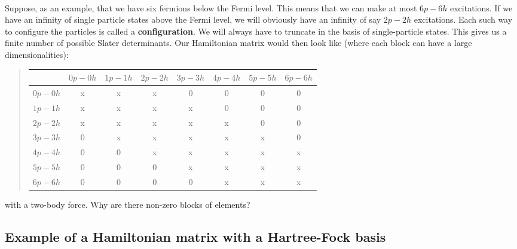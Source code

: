 \documentclass[%
oneside,                 %
final,                   %
10pt]{article}
\begin{document}
\paragraph{}
Suppose, as an example, that we have six fermions below the Fermi level.
This means that we can make at most $6p-6h$ excitations. If we have an infinity of single particle states above the Fermi level, we will obviously have an infinity of say $2p-2h$ excitations. Each such way to configure the particles is called a \textbf{configuration}. We will always have to truncate in the basis of single-particle states.
This gives us a finite number of possible Slater determinants. Our Hamiltonian matrix would then look like (where each block can have a large dimensionalities):


\begin{quote}
\begin{tabular}{cccccccc}
\hline
\multicolumn{1}{c}{  } & \multicolumn{1}{c}{ $0p-0h$ } & \multicolumn{1}{c}{ $1p-1h$ } & \multicolumn{1}{c}{ $2p-2h$ } & \multicolumn{1}{c}{ $3p-3h$ } & \multicolumn{1}{c}{ $4p-4h$ } & \multicolumn{1}{c}{ $5p-5h$ } & \multicolumn{1}{c}{ $6p-6h$ } \\
\hline
$0p-0h$ & x       & x       & x       & 0       & 0       & 0       & 0       \\
$1p-1h$ & x       & x       & x       & x       & 0       & 0       & 0       \\
$2p-2h$ & x       & x       & x       & x       & x       & 0       & 0       \\
$3p-3h$ & 0       & x       & x       & x       & x       & x       & 0       \\
$4p-4h$ & 0       & 0       & x       & x       & x       & x       & x       \\
$5p-5h$ & 0       & 0       & 0       & x       & x       & x       & x       \\
$6p-6h$ & 0       & 0       & 0       & 0       & x       & x       & x       \\
\hline
\end{tabular}
\end{quote}

\noindent
with a two-body force. Why are there non-zero blocks of elements?



\subsection*{Example of a Hamiltonian matrix with a Hartree-Fock basis}
\end{document}
